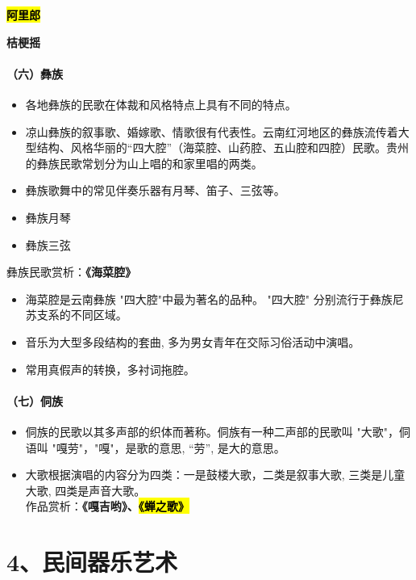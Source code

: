 \documentclass[
]{article}
\providecommand{\tightlist}{%
  \setlength{\itemsep}{0pt}\setlength{\parskip}{0pt}}
\begin{document}
\hl{\mbox{\textbf{阿里郎}}}

\textbf{桔梗摇}

\paragraph{（六）彝族}\label{ux516dux5f5dux65cf}

\begin{itemize}
\tightlist
\item
  各地彝族的民歌在体裁和风格特点上具有不同的特点。
\item
  凉山彝族的叙事歌、婚嫁歌、情歌很有代表性。云南红河地区的彝族流传着大型结构、风格华丽的``四大腔''（海菜腔、山药腔、五山腔和四腔）民歌。贵州的彝族民歌常划分为山上唱的和家里唱的两类。
\item
  彝族歌舞中的常见伴奏乐器有月琴、笛子、三弦等。
\item
  彝族月琴
\item
  彝族三弦
\end{itemize}

彝族民歌赏析：\textbf{《海菜腔》}

\begin{itemize}
\tightlist
\item
  海菜腔是云南彝族 "四大腔"中最为著名的品种。 "四大腔"
  分别流行于彝族尼苏支系的不同区域。
\item
  音乐为大型多段结构的套曲, 多为男女青年在交际习俗活动中演唱。
\item
  常用真假声的转换，多衬词拖腔。
\end{itemize}

\paragraph{（七）侗族}\label{ux4e03ux4f97ux65cf}

\begin{itemize}
\tightlist
\item
  侗族的民歌以其多声部的织体而著称。侗族有一种二声部的民歌叫
  "大歌"，侗语叫 "嘎劳"，"嘎"，是歌的意思, ``劳'', 是大的意思。
\item
  大歌根据演唱的内容分为四类：一是鼓楼大歌，二类是叙事大歌,
  三类是儿童大歌, 四类是声音大歌。\\
  作品赏析：\textbf{《嘎吉哟》、\hl{\mbox{《蝉之歌》}}}
\end{itemize}

\section{4、民间器乐艺术}\label{ux6c11ux95f4ux5668ux4e50ux827aux672f}
\end{document}

